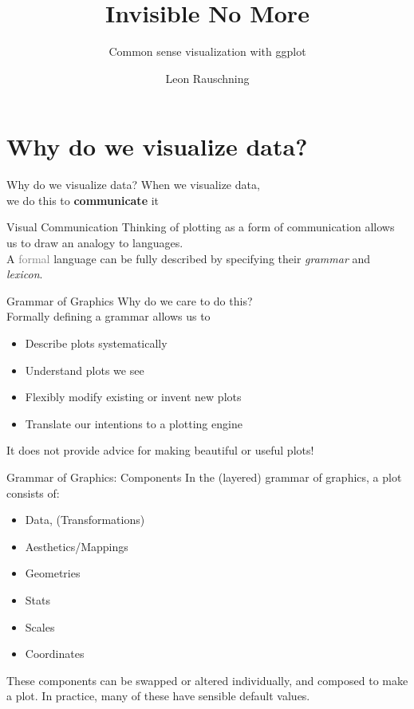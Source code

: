 \documentclass[11pt]{beamer}
\author{Leon Rauschning}
\title{Invisible No More}
\subtitle{Common sense visualization with ggplot}
\institute{LMU und TU Munich}
\newcommand{\gray}[1]{\textcolor{gray}{#1}}
\begin{document}
\begin{frame}
	\maketitle
\end{frame}

\section*{Why do we visualize data?}



\begin{frame}{Why do we visualize data?}
	When we visualize data, \\
	we do this to {\bf communicate} it
\end{frame}

\begin{frame}{Visual Communication}
	Thinking of plotting as a form of communication allows us to draw an analogy to languages.\\
	A \gray{formal} language can be fully described by specifying their \emph{grammar} and \emph{lexicon}.
\end{frame}

\begin{frame}{Grammar of Graphics}
	Why do we care to do this?\\
	Formally defining a grammar allows us to
	\pause
	\begin{itemize}
		\item Describe plots systematically
		\item Understand plots we see
		\item Flexibly modify existing or invent new plots
		\item Translate our intentions to a plotting engine
	\end{itemize}
	\pause
	It does not provide advice for making beautiful or useful plots!
\end{frame}


\begin{frame}{Grammar of Graphics: Components}
	In the (layered) grammar of graphics, a plot consists of:
	\begin{itemize}
		\item Data, (Transformations)
		\item Aesthetics/Mappings
		\item Geometries
		\item Stats
		\item Scales
		\item Coordinates
	\end{itemize}
	\pause
	These components can be swapped or altered individually, and composed to make a plot.
	In practice, many of these have sensible default values.
\end{frame}
\end{document}
